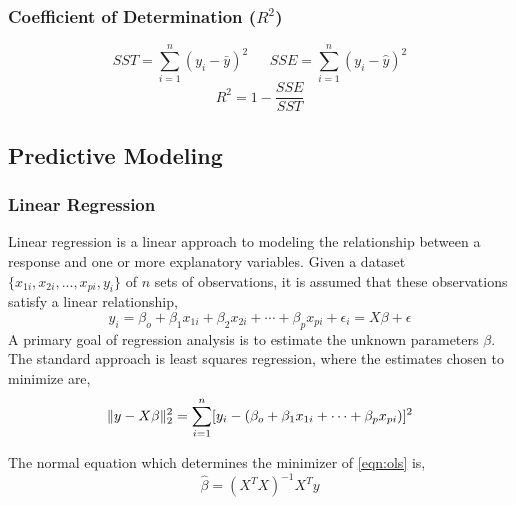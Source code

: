 \begin{sloppypar}
	\subsubsection{Coefficient of Determination ($R^2$)}
	\[SST = \sum_{i=1}^{n} (y_i - \bar{y})^2 \ \ \ \ \ \ \ SSE =  \sum_{i=1}^{n} (y_i - \hat{y})^2 \]
	\begin{equation} \label{eqn:r2}
	R^2 = 1 - \frac{SSE}{SST}
	\end{equation}
	
	\subsection{Predictive Modeling}
	\subsubsection{Linear Regression}
	Linear regression \citep{Chatterjee2013} is a linear approach to modeling the relationship between a response and one or more explanatory variables. Given a dataset $ \{x_{1i}, x_{2i}, ..., x_{pi}, y_i\} $ of $ n $ sets of observations, it is assumed that these observations satisfy a linear relationship,
	\begin{equation} \label{eqn:mlr}
	y_i = \beta_o + \beta_1 x_{1i} + \beta_2 x_{2i} + \cdots + \beta_p x_{pi} + \epsilon_i = X \beta + \epsilon
	\end{equation}
	A primary goal of regression analysis is to estimate the unknown parameters $ \beta$. The standard approach is least squares regression, where the estimates chosen to minimize are,
	\begin{equation} \label{eqn:ols}
	\lVert y - X\beta\rVert_2^2 = \sum_{i=1}^{n} [ y_i - (\beta_o + \beta_1 x_{1i} + \cdots + \beta_p x_{pi}) ]^2
	\end{equation}
	
	\hspace*{-0.6cm}The normal equation which determines the minimizer of \ref{eqn:ols} is,
	\begin{equation}
	\hat{\beta} = (X^{T}X)^{-1}X^{T}y
	\end{equation}
	

\end{sloppypar}
